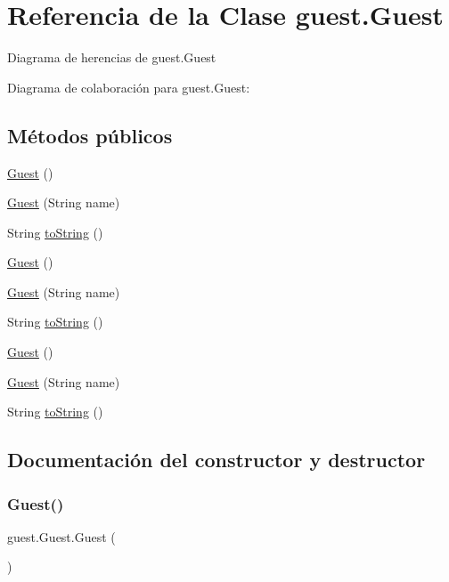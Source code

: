 \hypertarget{classguest_1_1_guest}{}\section{Referencia de la Clase guest.\+Guest}
\label{classguest_1_1_guest}


Diagrama de herencias de guest.\+Guest


Diagrama de colaboración para guest.\+Guest\+:
\subsection*{Métodos públicos}
\begin{DoxyCompactItemize}
\item 
\mbox{\hyperlink{classguest_1_1_guest_a62ac544b9a8dd72fc8f8c7e254ca6673}{Guest}} ()
\item 
\mbox{\hyperlink{classguest_1_1_guest_af21ff45befae1acd175e57c4ab0a8635}{Guest}} (String name)
\item 
String \mbox{\hyperlink{classguest_1_1_guest_ac4c1ef33075541a404cdbed4da0477a7}{to\+String}} ()
\item 
\mbox{\hyperlink{classguest_1_1_guest_a62ac544b9a8dd72fc8f8c7e254ca6673}{Guest}} ()
\item 
\mbox{\hyperlink{classguest_1_1_guest_af21ff45befae1acd175e57c4ab0a8635}{Guest}} (String name)
\item 
String \mbox{\hyperlink{classguest_1_1_guest_ac4c1ef33075541a404cdbed4da0477a7}{to\+String}} ()
\item 
\mbox{\hyperlink{classguest_1_1_guest_a62ac544b9a8dd72fc8f8c7e254ca6673}{Guest}} ()
\item 
\mbox{\hyperlink{classguest_1_1_guest_af21ff45befae1acd175e57c4ab0a8635}{Guest}} (String name)
\item 
String \mbox{\hyperlink{classguest_1_1_guest_ac4c1ef33075541a404cdbed4da0477a7}{to\+String}} ()
\end{DoxyCompactItemize}


\subsection{Documentación del constructor y destructor}
\mbox{\label{classguest_1_1_guest_a62ac544b9a8dd72fc8f8c7e254ca6673}} 
\subsubsection{\texorpdfstring{Guest()}{Guest()}\hspace{0.1cm}{\footnotesize\ttfamily [1/6]}}
{\footnotesize\ttfamily guest.\+Guest.\+Guest (\begin{DoxyParamCaption}{ }\end{DoxyParamCaption})}

